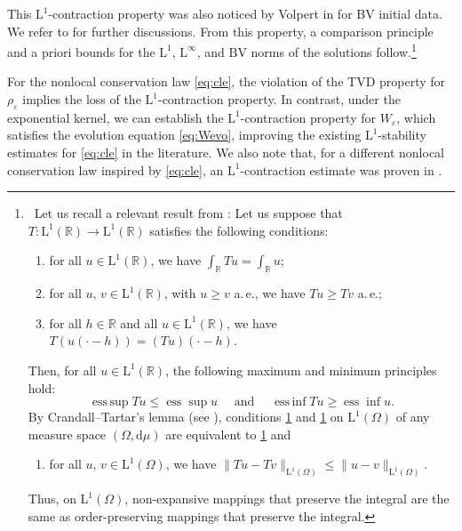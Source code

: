\documentclass[10pt]{amsart}
\theoremstyle{plain}
\theoremstyle{definition}
\numberwithin{equation}{section}
\newcommand{\eps}{{\varepsilon}}
\DeclareMathOperator*{\essinf}{ess\,\inf}
\DeclareMathOperator*{\esssup}{ess\,\sup}
\begin{document}
This $\mathrm{L}^1$-contraction property was also noticed by Volpert in \cite{zbMATH03269216} for BV initial data. We refer to \cite{MR2103702} for further discussions. From this property, a comparison principle and a priori bounds for the $\mathrm{L}^1$, $\mathrm{L}^{\infty}$, and $\mathrm{BV}$ norms of the solutions follow.\footnote{~Let us recall a relevant result from \cite{zbMATH01222044}: 
Let us suppose that $T: \mathrm{L}^1\left(\mathbb{R}\right) \rightarrow \mathrm{L}^1\left(\mathbb{R}\right)$ satisfies the following conditions:
\begin{enumerate}[label={\arabic*.}]
    \item \label{it:L1.1} for all $u \in \mathrm{L}^1\left(\mathbb{R}\right)$,  we have $\int_{\mathbb{R}} T u=\int_{\mathbb{R}} u$;
    \item \label{it:L1.2}  for all $u, \, v \in \mathrm{L}^1\left(\mathbb{R}\right)$, with $u \geq v$ a.\,e., we have $T u \geq T v$ a.\,e.;
    \item \label{it:L1.3} for all $h \in \mathbb{R}$ and all $u \in \mathrm{L}^1\left(\mathbb{R}\right)$, we have $T(u(\cdot-h))=(T u)(\cdot-h)$.
\end{enumerate} 
Then, for all $u \in \mathrm{L}^1\left(\mathbb{R}\right)$, the following maximum and minimum principles hold: 
$$
\esssup T u \leq \operatorname{ess} \sup u \quad \text { and } \quad \essinf T u \geq \operatorname{ess} \inf u.
$$
By Crandall--Tartar's lemma (see \cite{zbMATH03703495}), conditions \cref{it:L1.1}  and \cref{it:L1.2}  on $\mathrm{L}^1(\Omega)$ of any measure space $(\Omega, \mathrm{d} \mu)$ are equivalent to \cref{it:L1.1} and
\begin{enumerate}
    \item[2'.] for all $u,\, v \in \mathrm{L}^1(\Omega)$, we have $\|T u-T v\|_{\mathrm{L}^1(\Omega)} \leq\|u-v\|_{\mathrm{L}^1(\Omega)}$.
\end{enumerate}
Thus, on $\mathrm{L}^1(\Omega)$, non-expansive mappings that preserve the integral are the same as order-preserving mappings that preserve the integral.}


For the nonlocal conservation law \cref{eq:cle}, the violation of the TVD property for $\rho_\eps$ implies the loss of the $\mathrm{L}^1$-contraction property. In contrast, under the exponential kernel, we can establish the $\mathrm{L}^1$-contraction property for $W_\eps$, which satisfies the evolution equation \cref{eq:Wevo}, improving the existing $\mathrm{L}^1$-stability estimates for \cref{eq:cle} in the literature. We also note that, for a different nonlocal conservation law inspired by \cref{eq:cle}, an $\mathrm{L}^1$-contraction estimate was proven in \cite{coclite2025upwind}.
\end{document}
